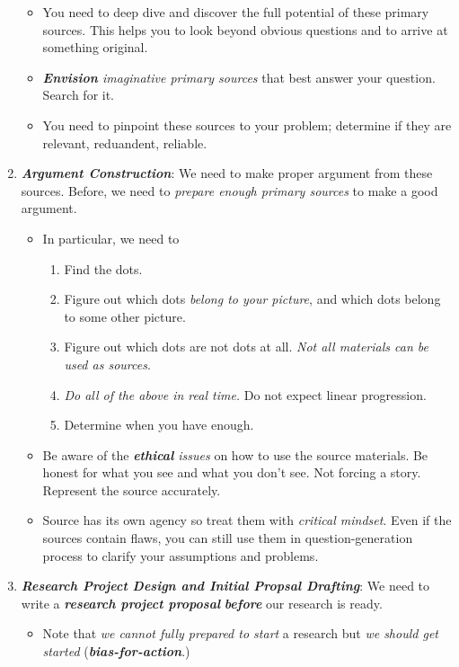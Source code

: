 \documentclass[11pt]{article}
\begin{document}
\begin{enumerate}
\begin{itemize}
\item You need to deep dive and discover the full potential of these primary sources.  This helps you to look beyond obvious questions and to arrive at something original.

\item \emph{\textbf{Envision} imaginative primary sources} that best answer your question. Search for it.

\item You need to pinpoint these sources to your problem; determine if they are relevant, reduandent, reliable. 
\end{itemize}

\item \emph{\textbf{Argument Construction}}: We need to make proper argument from these sources. Before, we need to \emph{prepare enough primary sources} to make a good argument. 
\begin{itemize}
\item In particular, we need to 
\begin{enumerate}
\item Find the dots. 
\item Figure out which dots \emph{belong to your picture}, and which dots belong to some other picture. 
\item Figure out which dots are not dots at all. \emph{Not all materials can be used as sources}. 
\item \emph{Do all of the above in real time.} Do not expect linear progression. 
\item Determine when you have enough.
\end{enumerate}

\item Be aware of the \emph{\textbf{ethical} issues} on how to use the source materials. Be honest for what you see and what you don't see. Not forcing a story. Represent the source accurately. 

\item Source has its own agency so treat them with \emph{critical mindset}. Even if the sources contain flaws, you can still use them in question-generation process to clarify your assumptions and problems. 
\end{itemize}
 
\item  \emph{\textbf{Research Project Design and Initial Propsal Drafting}}: We need to write a \emph{\textbf{research project proposal}} \emph{\textbf{before}} our research is ready. 
\begin{itemize}
\item Note that \emph{we cannot fully prepared to start} a research but \emph{we should get started} (\emph{\textbf{bias-for-action}}.)  


\end{itemize}
\end{enumerate}
\end{document}
